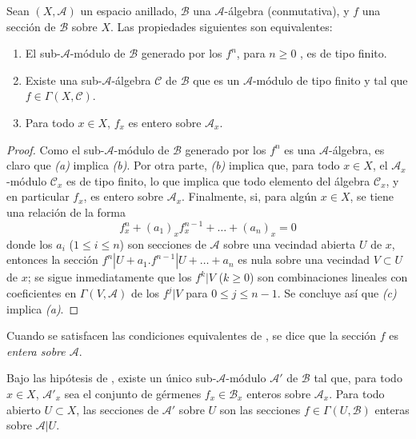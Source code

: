 \documentclass[oneside,10pt]{amsart}
\renewcommand{\leq}{\leqslant}
\renewcommand{\geq}{\geqslant}
\newcommand{\oldpage}[2][]{\marginnote{\normalfont\footnotesize\textbf{#1}~|~#2}\ignorespaces}
\let\EGAOriginalLabel\label
\renewcommand{\label}[1]{\phantomsection\EGAOriginalLabel{#1}}
\begin{document}
\begin{proposition}[6.3.1]
\label{II.6.3.1-fr}
Sean $(X,\mathcal{A})$ un espacio anillado, $\mathcal{B}$ una $\mathcal{A}$-álgebra (conmutativa), y $f$ una sección de $\mathcal{B}$ sobre $X$.
Las propiedades siguientes son equivalentes:
\begin{enumerate}
  \item[{\rm(a)}] El sub-$\mathcal{A}$-módulo de $\mathcal{B}$ generado por los $f^n$, para $n\geq 0$ \textup{}, es de tipo finito.
  \item[{\rm(b)}] Existe una sub-$\mathcal{A}$-álgebra $\mathcal{C}$ de $\mathcal{B}$ que es un $\mathcal{A}$-módulo de tipo finito y tal que $f\in\Gamma(X,\mathcal{C})$.
  \item[{\rm(c)}] Para todo $x\in X$, $f_x$ es entero sobre $\mathcal{A}_x$.
\end{enumerate}
\end{proposition}

\oldpage[II]{117}
\begin{proof}
Como el sub-$\mathcal{A}$-módulo de $\mathcal{B}$ generado por los $f^n$ es una $\mathcal{A}$-álgebra, es claro que \emph{(a)} implica \emph{(b)}.
Por otra parte, \emph{(b)} implica que, para todo $x\in X$, el $\mathcal{A}_x$-módulo $\mathcal{C}_x$ es de tipo finito, lo que implica que todo elemento del álgebra $\mathcal{C}_x$, y en particular $f_x$, es entero sobre $\mathcal{A}_x$.
Finalmente, si, para algún $x\in X$, se tiene una relación de la forma
\[
f_x^n+(a_1)_xf_x^{n-1}+\ldots+(a_n)_x=0
\]
donde los $a_i$ ($1\leq i\leq n$) son secciones de $\mathcal{A}$ sobre una vecindad abierta $U$ de $x$, entonces la sección $f^n|U+a_1.f^{n-1}|U+\ldots+a_n$ es nula sobre una vecindad $V\subset U$ de $x$; se sigue inmediatamente que los $f^k|V$ ($k\geq0$) son combinaciones lineales con coeficientes en $\Gamma(V,\mathcal{A})$ de los $f^j|V$ para $0\leq j\leq n-1$.
Se concluye así que \emph{(c)} implica \emph{(a)}.
\end{proof}

Cuando se satisfacen las condiciones equivalentes de , se dice que la sección $f$ es \emph{entera sobre $\mathcal{A}$}.

\begin{corollary}[6.3.2]
\label{II.6.3.2-fr}
Bajo las hipótesis de , existe un único sub-$\mathcal{A}$-módulo $\mathcal{A}'$ de $\mathcal{B}$ tal que, para todo $x\in X$, $\mathcal{A}'_x$ sea el conjunto de gérmenes $f_x\in\mathcal{B}_x$ enteros sobre $\mathcal{A}_x$.
Para todo abierto $U\subset X$, las secciones de $\mathcal{A}'$ sobre $U$ son las secciones $f\in\Gamma(U,\mathcal{B})$ enteras sobre $\mathcal{A}|U$.
\end{corollary}
\end{document}
